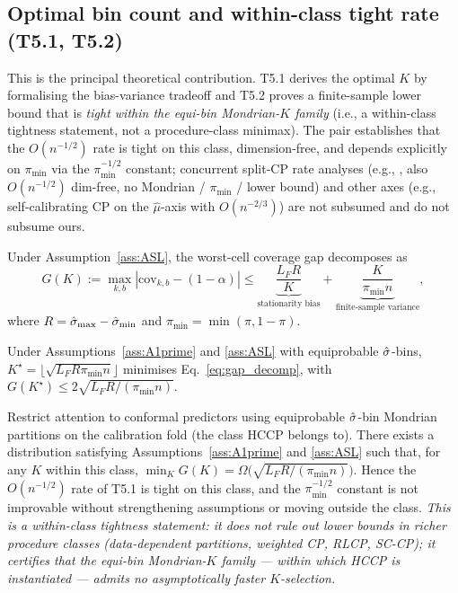 \subsection{Optimal bin count and within-class tight rate (T5.1, T5.2)}
\label{sec:theory:t5}

This is the principal theoretical contribution. T5.1 derives the optimal $K$ by formalising the bias-variance tradeoff and T5.2 proves a finite-sample lower bound that is \emph{tight within the equi-bin Mondrian-$K$ family} (i.e., a within-class tightness statement, not a procedure-class minimax). The pair establishes that the $O(n^{-1/2})$ rate is tight on this class, dimension-free, and depends explicitly on $\pi_{\min}$ via the $\pi_{\min}^{-1/2}$ constant; concurrent split-CP rate analyses (e.g., \citet{yao2026nonasymp}, also $O(n^{-1/2})$ dim-free, no Mondrian / $\pi_{\min}$ / lower bound) and other axes (e.g., self-calibrating CP \citep{vanderlaan2024sccp} on the $\hat\mu$-axis with $O(n^{-2/3})$) are not subsumed and do not subsume ours.

Under Assumption~\ref{ass:ASL}, the worst-cell coverage gap decomposes as
\begin{equation}
\label{eq:gap_decomp}
G(K) := \max_{k,b} |\mathrm{cov}_{k,b} - (1 - \alpha)| \leq \underbrace{\frac{L_F R}{K}}_{\text{stationarity bias}} + \underbrace{\frac{K}{\pi_{\min} n}}_{\text{finite-sample variance}},
\end{equation}
where $R = \hat{\sigma}_{\max} - \hat{\sigma}_{\min}$ and $\pi_{\min} = \min(\pi, 1 - \pi)$.

\begin{theorem}
\label{thm:t5oracle}
Under Assumptions~\ref{ass:A1prime} and \ref{ass:ASL} with equiprobable $\hat{\sigma}$-bins,
$K^\star = \lfloor \sqrt{L_F R \pi_{\min} n}\rfloor$ minimises Eq.~\eqref{eq:gap_decomp}, with
$G(K^\star) \leq 2\sqrt{L_F R / (\pi_{\min} n)}$.
\end{theorem}

\begin{theorem}
\label{thm:t5lower}
Restrict attention to conformal predictors using equiprobable $\hat{\sigma}$-bin Mondrian partitions on the calibration fold (the class HCCP belongs to). There exists a distribution satisfying Assumptions~\ref{ass:A1prime} and \ref{ass:ASL} such that, for any $K$ within this class, $\min_K G(K) = \Omega\bigl(\sqrt{L_F R / (\pi_{\min} n)}\bigr)$. Hence the $O(n^{-1/2})$ rate of T5.1 is tight on this class, and the $\pi_{\min}^{-1/2}$ constant is not improvable without strengthening assumptions or moving outside the class. \emph{This is a within-class tightness statement: it does not rule out lower bounds in richer procedure classes (data-dependent partitions, weighted CP, RLCP, SC-CP); it certifies that the equi-bin Mondrian-$K$ family — within which HCCP is instantiated — admits no asymptotically faster $K$-selection.}
\end{theorem}

